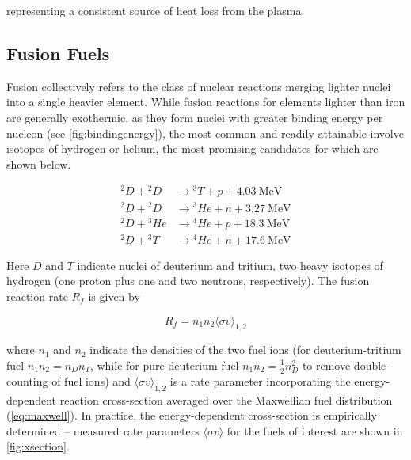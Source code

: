 \noindent representing a consistent source of heat loss from the plasma.

\subsection{Fusion Fuels}\label{subsec:intro_fuels}

Fusion collectively refers to the class of nuclear reactions merging lighter nuclei into a single heavier element.  While fusion reactions for elements lighter than iron are generally exothermic, as they form nuclei with greater binding energy per nucleon (see \cref{fig:bindingenergy}), the most common and readily attainable involve isotopes of hydrogen or helium, the most promising candidates for which are shown below.

\begin{align}
 {}^2\si{D} + {}^2\si{D} &\rightarrow {}^3\si{T} + \si{p} + \SI{4.03}{\mega\electronvolt}\label{eq:dd1}\\
 {}^2\si{D} + {}^2\si{D} &\rightarrow {}^{3}\si{He} + \si{n} + \SI{3.27}{\mega\electronvolt}\label{eq:dd2}\\
 {}^2\si{D} + {}^3\si{He} &\rightarrow {}^4\si{He} + \si{p} + \SI{18.3}{\mega\electronvolt}\label{eq:dhe3}\\
  {}^2\si{D} + {}^3\si{T} &\rightarrow {}^4\si{He} + \si{n} + \SI{17.6}{\mega\electronvolt}\label{eq:dt}
\end{align}

\noindent Here $\si{D}$ and $\si{T}$ indicate nuclei of deuterium and tritium, two heavy isotopes of hydrogen (one proton plus one and two neutrons, respectively).  The fusion reaction rate $R_f$ is given by

\begin{equation}\label{eq:rate}
 R_f = n_1 n_2 \langle \sigma v \rangle_{1,2}
\end{equation}

\noindent where $n_1$ and $n_2$ indicate the densities of the two fuel ions (\eg for deuterium-tritium fuel $n_1 n_2 = n_D n_T$, while for pure-deuterium fuel $n_1 n_2 = \frac{1}{2} n_D^2$ to remove double-counting of fuel ions) and $\langle \sigma v \rangle_{1,2}$ is a rate parameter incorporating the energy-dependent reaction cross-section averaged over the Maxwellian fuel distribution (\cref{eq:maxwell}).  In practice, the energy-dependent cross-section is empirically determined -- measured rate parameters $\langle \sigma v \rangle$ for the fuels of interest are shown in \cref{fig:xsection}.

